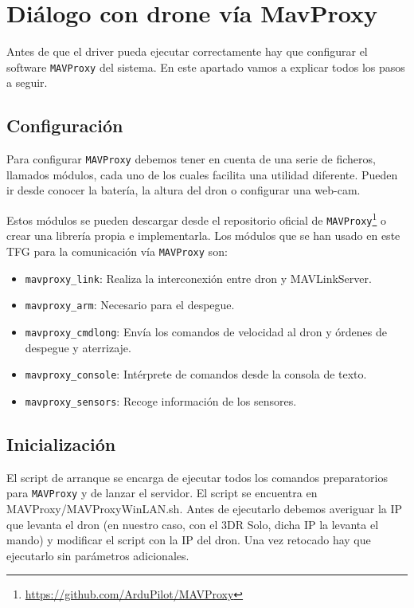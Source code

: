 \section{Diálogo con drone vía MavProxy}
Antes de que el driver pueda ejecutar correctamente hay que configurar el software \texttt{MAVProxy} del sistema. En este apartado vamos a explicar todos los pasos a seguir.

\subsection{Configuración}
\label{Pre-Configuracion}
Para configurar \texttt{MAVProxy} debemos tener en cuenta de una serie de ficheros, llamados módulos,  cada uno de los cuales facilita una utilidad diferente. Pueden ir desde conocer la batería, la altura del dron o configurar una web-cam.

Estos módulos se pueden descargar desde el repositorio oficial de \texttt{MAVProxy}\footnote{\url{https://github.com/ArduPilot/MAVProxy}} o crear una librería propia e implementarla. Los módulos que se han usado en este TFG para la comunicación vía \texttt{MAVProxy} son: 

\begin{itemize}
\item \texttt{mavproxy\_link}: Realiza la interconexión entre dron y MAVLinkServer.
\item \texttt{mavproxy\_arm}: Necesario para el despegue.
\item \texttt{mavproxy\_cmdlong}: Envía los comandos de velocidad al dron y órdenes de despegue y aterrizaje.
\item \texttt{mavproxy\_console}: Intérprete de comandos desde la consola de texto.
\item \texttt{mavproxy\_sensors}: Recoge información de los sensores.
\end{itemize}

\subsection{Inicialización}
El script de arranque se encarga de ejecutar todos los comandos preparatorios para \texttt{MAVProxy} y de lanzar el servidor. El script se encuentra en MAVProxy/MAVProxyWinLAN.sh. Antes de ejecutarlo debemos averiguar la IP que levanta el dron (en nuestro caso, con el 3DR Solo, dicha IP la levanta el mando) y modificar el script con la IP del dron. Una vez retocado hay que ejecutarlo sin parámetros adicionales. 

